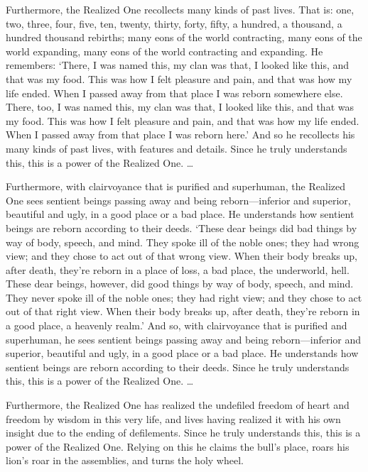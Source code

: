 \documentclass[12pt,openany]{book}%
\begin{document}
Furthermore, the Realized One recollects many kinds of past lives. That is: one, two, three, four, five, ten, twenty, thirty, forty, fifty, a hundred, a thousand, a hundred thousand rebirths; many eons of the world contracting, many eons of the world expanding, many eons of the world contracting and expanding. He remembers: ‘There, I was named this, my clan was that, I looked like this, and that was my food. This was how I felt pleasure and pain, and that was how my life ended. When I passed away from that place I was reborn somewhere else. There, too, I was named this, my clan was that, I looked like this, and that was my food. This was how I felt pleasure and pain, and that was how my life ended. When I passed away from that place I was reborn here.’ And so he recollects his many kinds of past lives, with features and details. Since he truly understands this, this is a power of the Realized One. … 

Furthermore, with clairvoyance that is purified and superhuman, the Realized One sees sentient beings passing away and being reborn—inferior and superior, beautiful and ugly, in a good place or a bad place. He understands how sentient beings are reborn according to their deeds. ‘These dear beings did bad things by way of body, speech, and mind. They spoke ill of the noble ones; they had wrong view; and they chose to act out of that wrong view. When their body breaks up, after death, they’re reborn in a place of loss, a bad place, the underworld, hell. These dear beings, however, did good things by way of body, speech, and mind. They never spoke ill of the noble ones; they had right view; and they chose to act out of that right view. When their body breaks up, after death, they’re reborn in a good place, a heavenly realm.’ And so, with clairvoyance that is purified and superhuman, he sees sentient beings passing away and being reborn—inferior and superior, beautiful and ugly, in a good place or a bad place. He understands how sentient beings are reborn according to their deeds. Since he truly understands this, this is a power of the Realized One. … 

Furthermore, the Realized One has realized the undefiled freedom of heart and freedom by wisdom in this very life, and lives having realized it with his own insight due to the ending of defilements. Since he truly understands this, this is a power of the Realized One. Relying on this he claims the bull’s place, roars his lion’s roar in the assemblies, and turns the holy wheel. 
\end{document}
